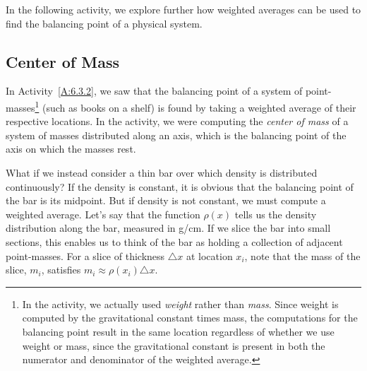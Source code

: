 In the following activity, we explore further how weighted averages can be used to find the balancing point of a physical system.



\subsection*{Center of Mass} 

In Activity~\ref{A:6.3.2}, we saw that the balancing point of a system of point-masses\footnote{In the activity, we actually used \emph{weight} rather than \emph{mass}.  Since weight is computed by the gravitational constant times mass, the computations for the balancing point result in the same location regardless of whether we use weight or mass, since the gravitational constant is present in both the numerator and denominator of the weighted average.} (such as books on a shelf) is found by taking a weighted average of their respective locations.  In the activity, we were computing the \emph{center of mass} of a system of masses distributed along an axis, which is the balancing point of the axis on which the masses rest.

\vspace*{5pt}
\nin {}
\vspace*{1pt}

What if we instead consider a thin bar over which density is distributed continuously?  If the density is constant, it is obvious that the balancing point of the bar is its midpoint.  But if density is not constant, we must compute a weighted average.  Let's say that the function $\rho(x)$ tells us the density distribution along the bar, measured in g/cm.  If we slice the bar into small sections, this enables us to think of the bar as holding a collection of adjacent point-masses.  For a slice of thickness $\triangle x$ at location $x_i$, note that the mass of the slice, $m_i$, satisfies $m_i \approx \rho(x_i) \triangle x$.



